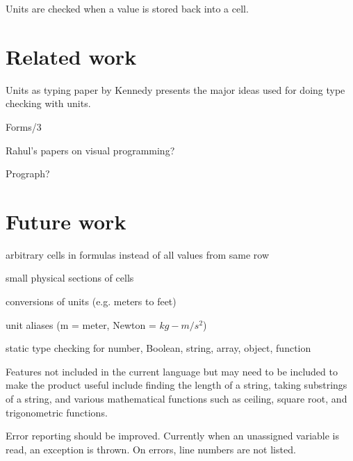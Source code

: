 \documentclass{acm_proc_article-sp}
\begin{document}
Units are checked when a value is stored back into a cell.

\section{Related work}
Units as typing paper by Kennedy presents the major ideas used for
doing type checking with units.\cite{DBLP:conf/cefp/Kennedy09}

Forms/3

Rahul's papers on visual programming?

Prograph?

\section{Future work}
arbitrary cells in formulas instead of all values from same row

small physical sections of cells

conversions of units (e.g. meters to feet)

unit aliases (m = meter, Newton = $kg-m/s^2$)

static type checking for number, Boolean, string, array, object, function

Features not included in the current language but may need to be
included to make the product useful include finding the length of a
string, taking substrings of a string, and various mathematical
functions such as ceiling, square root, and trigonometric functions.

Error reporting should be improved. Currently when an unassigned
variable is read, an exception is thrown. On errors, line numbers
are not listed.


\end{document}
